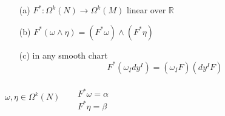 \begin{lemma}[14.16]
\begin{enumerate}
  \item[(a)] $F^* : \Omega^k(N) \to \Omega^k(M)$ linear over $\mathbb{R}$ 
\item[(b)] $F^*(\omega \wedge \eta) = (F^* \omega) \wedge (F^* \eta)$
\item[(c)] in any smooth chart 
\[
F^*( \omega_{\underline{I}} dy^{\underline{I}} ) = (\omega_{\underline{I}} F) ( dy^{ \underline{I}} F)
\]
\end{enumerate}
\end{lemma}




$\omega, \eta \in \Omega^k(N)$ \quad \quad \, $\begin{aligned} & \quad \\
  & F^* \omega = \alpha \\
  & F^* \eta = \beta \end{aligned}$


